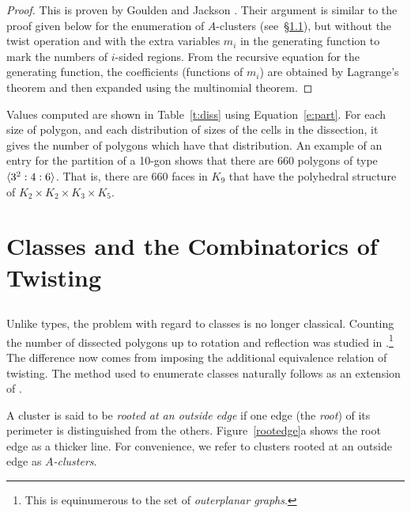 \documentclass[10pt]{amsart}
\begin{document}
\begin{proof}
This is proven by Goulden and Jackson \cite[Exercise 2.7.14]{gj}. Their argument is similar to the proof given below for the enumeration of $A$-clusters (see~\S\ref{ss:aclusters}), but without the twist operation and with the extra variables $m_i$ in the generating function to mark the numbers of $i$-sided regions. From the recursive equation for the generating function, the coefficients (functions of $m_i$) are obtained by Lagrange's theorem and then expanded using the multinomial theorem.
\end{proof}

Values computed are shown in Table~\ref{t:diss} using Equation~\ref{e:part}.  For each size of polygon, and each distribution of sizes of the cells in the dissection, it gives the number of polygons which have that distribution.  An example of an entry for the partition of a 10-gon shows that there are 660 polygons of type ${\langle} 3^2:4:6 {\rangle}$.  That is, there are 660 faces in $K_9$ that have the polyhedral structure of $K_2 \times K_2 \times K_3 \times K_5$.

%
%

\section {Classes and the Combinatorics of Twisting}

\subsection{} \label{ss:aclusters}
Unlike types, the problem with regard to classes is no longer classical. Counting the number of dissected polygons up to rotation and reflection was studied in \cite{r1}.\footnote{This is equinumerous to the set of {\em outerplanar graphs}.}   The difference now comes from imposing the additional equivalence relation of twisting.  The method used to enumerate classes naturally follows as an extension of \cite{r1}.   

\begin{defn}
A cluster is said to be {\em rooted at an outside edge} if one edge (the {\em root}) of its perimeter is distinguished from the others.  Figure~\ref{rootedge}a shows the root edge as a thicker line. For convenience, we refer to clusters rooted at an outside edge as {\em $A$-clusters}.
\end{defn}
\end{document}

